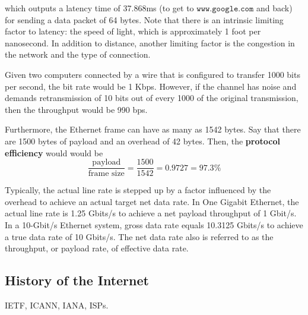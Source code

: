 \documentclass{article}
\begin{document}
\begin{definition}
\begin{enumerate}
        which outputs a latency time of 37.868ms (to get to $\texttt{www.google.com}$ and back) for sending a data packet of 64 bytes. Note that there is an intrinsic limiting factor to latency: the speed of light, which is approximately 1 foot per nanosecond. In addition to distance, another limiting factor is the congestion in the network and the type of connection. 
      \end{enumerate}
    \end{definition}

    \begin{example}
    Given two computers connected by a wire that is configured to transfer 1000 bits per second, the bit rate would be 1 Kbps. However, if the channel has noise and demands retransmission of 10 bits out of every 1000 of the original transmission, then the throughput would be 990 bps. 

    Furthermore, the Ethernet frame can have as many as 1542 bytes. Say that there are 1500 bytes of payload and an overhead of 42 bytes. Then, the \textbf{protocol efficiency} would would be 
    \[\frac{\text{payload}}{\text{frame size}} = \frac{1500}{1542} = 0.9727 = 97.3\%\]
    \end{example}

    Typically, the actual line rate is stepped up by a factor influenced by the overhead to achieve an actual target net data rate. In One Gigabit Ethernet, the actual line rate is 1.25 Gbits/s to achieve a net payload throughput of 1 Gbit/s. In a 10-Gbit/s Ethernet system, gross data rate equals 10.3125 Gbits/s to achieve a true data rate of 10 Gbits/s. The net data rate also is referred to as the throughput, or payload rate, of effective data rate.

  \subsection{History of the Internet}

    IETF, ICANN, IANA, ISPs.  
\end{document}
